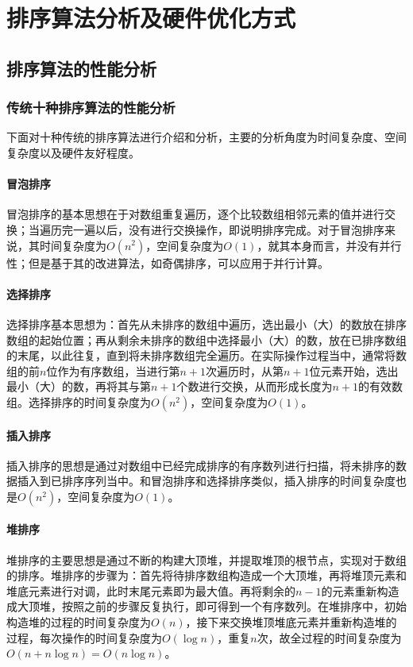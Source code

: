 
\chapter{排序算法分析及硬件优化方式}
\label{chap:sort_algorithm_intro}

\section{排序算法的性能分析}
\subsection{传统十种排序算法的性能分析}
下面对十种传统的排序算法进行介绍和分析，主要的分析角度为时间复杂度、空间复杂度以及硬件友好程度。

\subsubsection{冒泡排序}
    冒泡排序的基本思想在于对数组重复遍历，逐个比较数组相邻元素的值并进行交换；当遍历完一遍以后，没有进行交换操作，即说明排序完成。对于冒泡排序来说，其时间复杂度为$O(n^2)$，空间复杂度为$O(1)$，就其本身而言，并没有并行性；但是基于其的改进算法，如奇偶排序，可以应用于并行计算。

\subsubsection{选择排序}
    选择排序基本思想为：首先从未排序的数组中遍历，选出最小（大）的数放在排序数组的起始位置；再从剩余未排序的数组中选择最小（大）的数，放在已排序数组的末尾，以此往复，直到将未排序数组完全遍历。在实际操作过程当中，通常将数组的前$n$位作为有序数组，当进行第$n+1$次遍历时，从第$n+1$位元素开始，选出最小（大）的数，再将其与第$n+1$个数进行交换，从而形成长度为$n+1$的有效数组。选择排序的时间复杂度为$O(n^2)$，空间复杂度为$O(1)$。

\subsubsection{插入排序}
    插入排序的思想是通过对数组中已经完成排序的有序数列进行扫描，将未排序的数据插入到已排序序列当中。和冒泡排序和选择排序类似，插入排序的时间复杂度也是$O(n^2)$，空间复杂度为$O(1)$。

\subsubsection{堆排序}
    堆排序的主要思想是通过不断的构建大顶堆，并提取堆顶的根节点，实现对于数组的排序。堆排序的步骤为：首先将待排序数组构造成一个大顶堆，再将堆顶元素和堆底元素进行对调，此时末尾元素即为最大值。再将剩余的$n-1$的元素重新构造成大顶堆，按照之前的步骤反复执行，即可得到一个有序数列。在堆排序中，初始构造堆的过程的时间复杂度为$O(n)$，接下来交换堆顶堆底元素并重新构造堆的过程，每次操作的时间复杂度为$O(\log n)$，重复$n$次，故全过程的时间复杂度为$O(n+n\log n)=O(n\log n)$。

